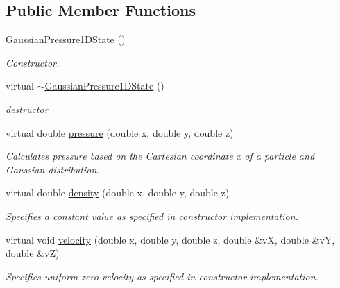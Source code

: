 \subsection*{Public Member Functions}
\begin{DoxyCompactItemize}
\item 
\hyperlink{classGaussianPressure1DState_a5c5fea45632862b61ec5f9a69d53fcdb}{Gaussian\-Pressure1\-D\-State} ()
\begin{DoxyCompactList}\small\item\em Constructor. \end{DoxyCompactList}\item 
\hypertarget{classGaussianPressure1DState_a0ed55872bc5dd3bd7b83f862e4d263d2}{virtual \hyperlink{classGaussianPressure1DState_a0ed55872bc5dd3bd7b83f862e4d263d2}{$\sim$\-Gaussian\-Pressure1\-D\-State} ()}\label{classGaussianPressure1DState_a0ed55872bc5dd3bd7b83f862e4d263d2}

\begin{DoxyCompactList}\small\item\em destructor \end{DoxyCompactList}\item 
virtual double \hyperlink{classGaussianPressure1DState_a595c03c5041c8c5a791ce377060801a1}{pressure} (double x, double y, double z)
\begin{DoxyCompactList}\small\item\em Calculates pressure based on the Cartesian coordinate x of a particle and Gaussian distribution. \end{DoxyCompactList}\item 
virtual double \hyperlink{classGaussianPressure1DState_a768ccf05d54c24afeea3b0391be1da12}{density} (double x, double y, double z)
\begin{DoxyCompactList}\small\item\em Specifies a constant value as specified in constructor implementation. \end{DoxyCompactList}\item 
virtual void \hyperlink{classGaussianPressure1DState_a1116ceea4ec6e19ae6a1200d6e8dc64b}{velocity} (double x, double y, double z, double \&v\-X, double \&v\-Y, double \&v\-Z)
\begin{DoxyCompactList}\small\item\em Specifies uniform zero velocity as specified in constructor implementation. \end{DoxyCompactList}\end{DoxyCompactItemize}


